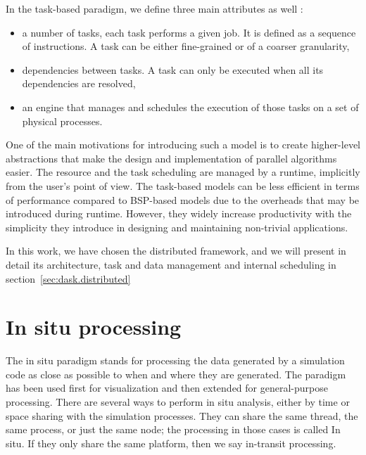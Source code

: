 

In the task-based paradigm, we define three main attributes as well :
\begin{itemize}
    \item a number of tasks, each task performs a given job. It is defined as a sequence of instructions. A task can be either fine-grained or of a coarser granularity, 
    \item dependencies between tasks. A task can only be executed when all its dependencies are resolved,
    \item an engine that manages and schedules the execution of those tasks on a set of physical processes.
\end{itemize}

One of the main motivations for introducing such a model is to create higher-level abstractions that make the design and implementation of parallel algorithms easier. The resource and the task scheduling are managed by a runtime, implicitly from the user's point of view. The task-based models can be less efficient in terms of performance compared to BSP-based models due to the overheads that may be introduced during runtime. However, they widely increase productivity with the simplicity they introduce in designing and maintaining non-trivial applications.   

In this work, we have chosen the \dask distributed framework, and we will present in detail its architecture, task and data management and internal scheduling in section~\ref{sec:dask.distributed} 



\section{In situ processing}

The in situ paradigm stands for processing the data generated by a simulation code as close as possible to when and where they are generated. The paradigm has been used first for visualization\cite{} and then extended for general-purpose processing. There are several ways to perform in situ analysis, either by time or space sharing with the simulation processes. They can share the same thread, the same process, or just the same node; the processing in those cases is called In situ. If they only share the same platform, then we say in-transit processing.

